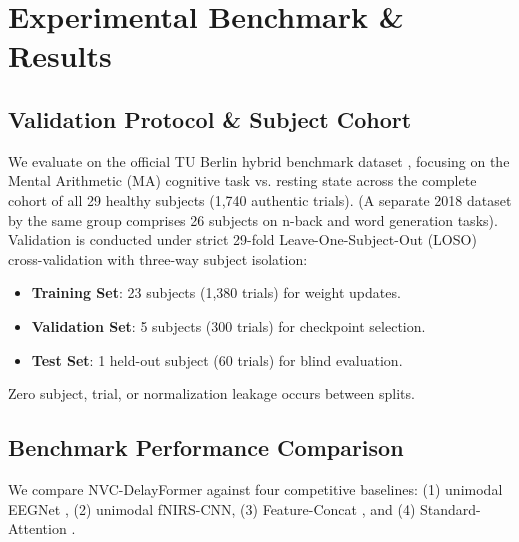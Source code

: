 \documentclass[journal]{IEEEtran}
\begin{document}
\section{Experimental Benchmark \& Results}

\subsection{Validation Protocol \& Subject Cohort}
We evaluate on the official TU Berlin hybrid benchmark dataset \cite{shin2017open}, focusing on the Mental Arithmetic (MA) cognitive task vs. resting state across the complete cohort of all 29 healthy subjects (1,740 authentic trials). (A separate 2018 dataset by the same group \cite{shin2018simultaneous} comprises 26 subjects on n-back and word generation tasks). Validation is conducted under strict 29-fold Leave-One-Subject-Out (LOSO) cross-validation with three-way subject isolation:
\begin{itemize}
    \item \textbf{Training Set}: 23 subjects (1,380 trials) for weight updates.
    \item \textbf{Validation Set}: 5 subjects (300 trials) for checkpoint selection.
    \item \textbf{Test Set}: 1 held-out subject (60 trials) for blind evaluation.
\end{itemize}
Zero subject, trial, or normalization leakage occurs between splits.

\subsection{Benchmark Performance Comparison}
We compare NVC-DelayFormer against four competitive baselines: (1) unimodal EEGNet \cite{lawhern2018eegnet}, (2) unimodal fNIRS-CNN, (3) Feature-Concat \cite{fazli2012enhanced}, and (4) Standard-Attention \cite{vaswani2017attention}.
\end{document}
